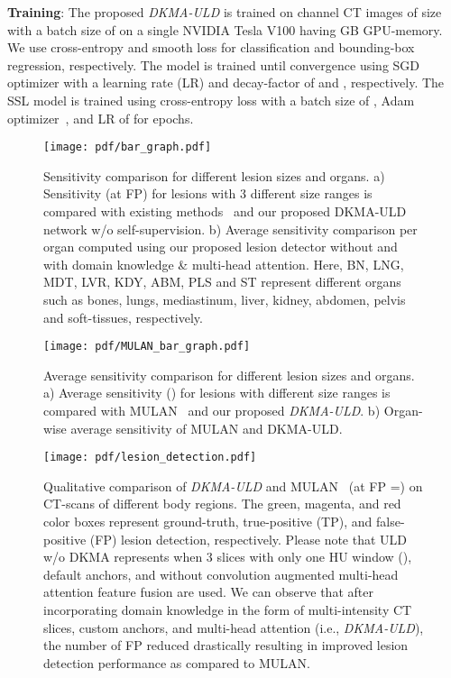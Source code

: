 \documentclass{bmvc2k}
\begin{document}
\noindent \textbf{Training}: The proposed \emph{DKMA-ULD} is trained on  channel CT images of size  with a batch size of  on a single NVIDIA Tesla V100 having GB GPU-memory. We use cross-entropy and smooth  loss for classification and bounding-box regression, respectively. The model is trained until convergence using SGD optimizer with a learning rate (LR) and decay-factor of  and , respectively. The SSL model is trained using cross-entropy loss with a batch size of , Adam optimizer~\cite{kingma2014adam}, and LR of  for  epochs.\\

\begin{figure}[t]
  \centering
  \texttt{[image: pdf/bar\_graph.pdf]}
  \caption{\small{Sensitivity comparison for different lesion sizes and organs. a) Sensitivity (at FP) for lesions with 3 different size ranges is compared with existing methods~\cite{3dce, retinanet_improv, yan2019mulan} and our proposed DKMA-ULD network w/o self-supervision. b) Average sensitivity comparison per organ computed using our proposed lesion detector without and with domain knowledge \& multi-head attention. Here, BN, LNG, MDT, LVR, KDY, ABM, PLS and ST represent different organs such as bones, lungs, mediastinum, liver, kidney, abdomen, pelvis and soft-tissues, respectively.
  }}
  \label{fig:lesion_size}
  \vspace{-2mm}
\end{figure}

\begin{figure}[t]
  \centering
  \texttt{[image: pdf/MULAN\_bar\_graph.pdf]}
  \caption{\small{Average sensitivity comparison for different lesion sizes and organs. a) Average sensitivity () for lesions with  different size ranges is compared with MULAN~\cite{yan2019mulan} and our proposed \emph{DKMA-ULD}. b) Organ-wise average sensitivity of MULAN and DKMA-ULD.
  }}
  \label{fig:lesion_size_mulan}
  \vspace{-2mm}
\end{figure}

\begin{figure}[t]
  \centering
  \texttt{[image: pdf/lesion\_detection.pdf]}
  \caption{\small{Qualitative comparison of \emph{DKMA-ULD} and MULAN~\cite{yan2019mulan} (at FP  =) on CT-scans of different body regions. The green, magenta, and red color boxes represent ground-truth, true-positive (TP), and false-positive (FP) lesion detection, respectively. Please note that ULD w/o DKMA represents when 3 slices with only one HU window (), default anchors, and without convolution augmented multi-head attention feature fusion are used. We can observe that after incorporating domain knowledge in the form of multi-intensity CT slices, custom anchors, and multi-head attention (i.e., \emph{DKMA-ULD}), the number of FP reduced drastically resulting in improved lesion detection performance as compared to MULAN.}}
  \vspace{-5mm}
  \label{fig:detection-results}
\end{figure}
\end{document}

